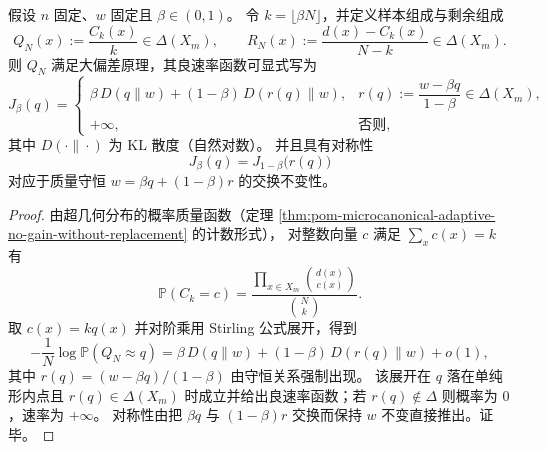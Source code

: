 \begin{theorem}\label{thm:pom-microcanonical-hypergeometric-ldp-kl-sym}
假设 \(n\) 固定、\(w\) 固定且 \(\beta\in(0,1)\)。
令 \(k=\lfloor\beta N\rfloor\)，并定义样本组成与剩余组成
\[
Q_N(x):=\frac{C_k(x)}{k}\in\Delta(X_m),
\qquad
R_N(x):=\frac{d(x)-C_k(x)}{N-k}\in\Delta(X_m).
\]
则 \(Q_N\) 满足大偏差原理，其良速率函数可显式写为
\[
J_\beta(q)=
\begin{cases}
\beta\,D(q\|w)+(1-\beta)\,D(r(q)\|w), & r(q):=\dfrac{w-\beta q}{1-\beta}\in\Delta(X_m),\\[6pt]
+\infty, & \text{否则},
\end{cases}
\]
其中 \(D(\cdot\|\cdot)\) 为 KL 散度（自然对数）。
并且具有对称性
\[
\boxed{\;
J_\beta(q)=J_{1-\beta}\bigl(r(q)\bigr)\;}
\]
对应于质量守恒 \(w=\beta q+(1-\beta)r\) 的交换不变性。
\end{theorem}
\begin{proof}
由超几何分布的概率质量函数（定理 \ref{thm:pom-microcanonical-adaptive-no-gain-without-replacement} 的计数形式），
对整数向量 \(c\) 满足 \(\sum_x c(x)=k\) 有
\[
\mathbb{P}(C_k=c)=\frac{\prod_{x\in X_m}\binom{d(x)}{c(x)}}{\binom{N}{k}}.
\]
取 \(c(x)=kq(x)\) 并对阶乘用 Stirling 公式展开，得到
\[
-\frac1N\log \mathbb{P}(Q_N\approx q)
=\beta\,D(q\|w)+(1-\beta)\,D(r(q)\|w)+o(1),
\]
其中 \(r(q)=(w-\beta q)/(1-\beta)\) 由守恒关系强制出现。
该展开在 \(q\) 落在单纯形内点且 \(r(q)\in\Delta(X_m)\) 时成立并给出良速率函数；若 \(r(q)\notin\Delta\) 则概率为 \(0\)，速率为 \(+\infty\)。
对称性由把 \(\beta q\) 与 \((1-\beta)r\) 交换而保持 \(w\) 不变直接推出。证毕。
\end{proof}

